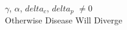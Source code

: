 \documentclass[preview]{standalone}
\begin{document}
\begin{center}
$\gamma$, $\alpha$, $delta_c$, $delta_p$ $\not= 0$\\Otherwise Disease Will Diverge
\end{center}
\end{document}
